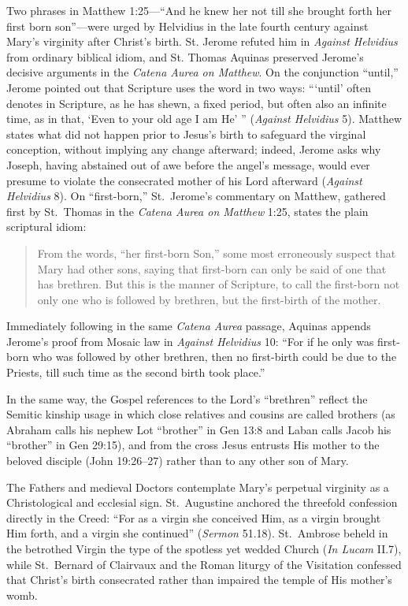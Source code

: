 Two phrases in Matthew 1:25---``And he knew her not till she brought forth her first born son''---were urged by Helvidius in the late fourth century against Mary's virginity after Christ's birth. St. Jerome refuted him in \textit{Against Helvidius} from ordinary biblical idiom, and St. Thomas Aquinas preserved Jerome's decisive arguments in the \textit{Catena Aurea on Matthew}. On the conjunction ``until,'' Jerome pointed out that Scripture uses the word in two ways: ``\thinspace`until' often denotes in Scripture, as he has shewn, a fixed period, but often also an infinite time, as in that, `Even to your old age I am He' '' (\textit{Against Helvidius} 5). Matthew states what did not happen prior to Jesus's birth to safeguard the virginal conception, without implying any change afterward; indeed, Jerome asks why Joseph, having abstained out of awe before the angel's message, would ever presume to violate the consecrated mother of his Lord afterward (\textit{Against Helvidius} 8). On ``first-born,'' St.\ Jerome's commentary on Matthew, gathered first by St.\ Thomas in the \textit{Catena Aurea on Matthew} 1:25, states the plain scriptural idiom:

\begin{quote}\small
From the words, ``her first-born Son,'' some most erroneously suspect that Mary had other sons, saying that first-born can only be said of one that has brethren. But this is the manner of Scripture, to call the first-born not only one who is followed by brethren, but the first-birth of the mother.
\end{quote}

Immediately following in the same \textit{Catena Aurea} passage, Aquinas appends Jerome's proof from Mosaic law in \textit{Against Helvidius} 10: ``For if he only was first-born who was followed by other brethren, then no first-birth could be due to the Priests, till such time as the second birth took place.''

In the same way, the Gospel references to the Lord's ``brethren'' reflect the Semitic kinship usage in which close relatives and cousins are called brothers (as Abraham calls his nephew Lot ``brother'' in Gen 13:8 and Laban calls Jacob his ``brother'' in Gen 29:15), and from the cross Jesus entrusts His mother to the beloved disciple (John 19:26--27) rather than to any other son of Mary.

The Fathers and medieval Doctors contemplate Mary's perpetual virginity as a Christological and ecclesial sign. St.\ Augustine anchored the threefold confession directly in the Creed: ``For as a virgin she conceived Him, as a virgin brought Him forth, and a virgin she continued'' (\textit{Sermon} 51.18). St.\ Ambrose beheld in the betrothed Virgin the type of the spotless yet wedded Church (\textit{In Lucam} II.7), while St.\ Bernard of Clairvaux and the Roman liturgy of the Visitation confessed that Christ's birth consecrated rather than impaired the temple of His mother's womb.

